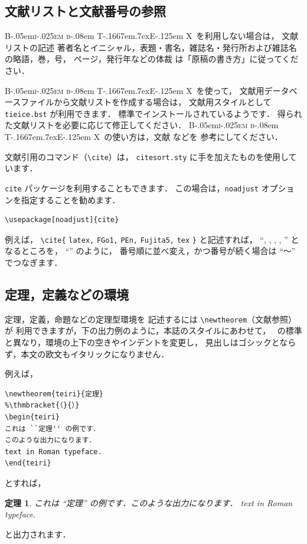 \documentclass[technicalreport]{ieicej}
\def\BibTeX{{\rmfamily B\kern-.05em{\scshape i\kern-.025em b}\kern-.08em
 T\kern-.1667em\lower.7ex\hbox{E}\kern-.125em X}}
\begin{document}
\subsection{文献リストと文献番号の参照}

\BibTeX\ を利用しない場合は，
文献リストの記述\ddash 
著者名とイニシャル，表題・書名，雑誌名・発行所および雑誌名の略語，巻，号，
ページ，発行年などの体裁\ddash 
は「原稿の書き方」に従ってください．

\BibTeX\ を使って，
文献用データベースファイルから文献リストを作成する場合は，
文献用スタイルとして \texttt{tieice.bst} が利用できます．
標準でインストールされているようです．
得られた文献リストを必要に応じて修正してください．
\BibTeX\ の使い方は，文献 \cite{latex,FMi1,Okumura8} などを
参考にしてください．

文献引用のコマンド（\verb/\cite/）は，
\texttt{citesort.sty} に手を加えたものを使用しています．

\texttt{cite} パッケージを利用することもできます．
この場合は，\texttt{noadjust} オプションを指定することを勧めます．
\begin{verbatim}
\usepackage[noadjust]{cite}
\end{verbatim}

例えば，
\verb/\cite{/\allowbreak
\texttt{latex,}\allowbreak
\texttt{FGo1,}\allowbreak
\texttt{PEn,}\allowbreak
\texttt{Fujita5,}\allowbreak
\texttt{tex}\allowbreak
\verb/}/ と記述すれば，
``\cite{latex}, \cite{FGo1}, \cite{PEn}, 
\cite{Fujita5}, \cite{tex}'' となるところを，
``\cite{latex,FGo1,PEn,Fujita5,tex}'' のように，
番号順に並べ変え，かつ番号が続く場合は ``〜'' でつなぎます．


\subsection{定理，定義などの環境}

定理，定義，命題などの定理型環境を
記述するには \verb/\newtheorem/（文献\cite{latex,FMi1}参照）が
利用できますが，下の出力例のように，本誌のスタイルにあわせて，
\LaTeXe\ の標準と異なり，環境の上下の空きやインデントを変更し，
見出しはゴシックとならず，本文の欧文もイタリックになりません．

例えば，
\begin{verbatim}
\newtheorem{teiri}{定理}
%\thmbracket{（}{）}
\begin{teiri}
これは ``定理'' の例です．
このような出力になります．
text in Roman typeface.
\end{teiri}
\end{verbatim}
とすれば，
\newtheorem{teiri}{定理}%
\begin{teiri}
これは ``定理'' の例です．このような出力になります．
text in Roman typeface.
\end{teiri}
と出力されます．
\end{document}
